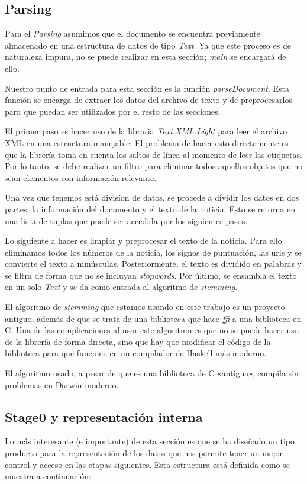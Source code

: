 \documentclass{nrfh-ish}
\begin{document}
\subsection{Parsing}
Para el \textit{Parsing} asumimos que el documento se encuentra
previamente almacenado en una estructura de datos de tipo \textit{Text}.
Ya que este proceso es de naturaleza impura, no se puede realizar
en esta sección; \textit{main} se encargará de ello.

Nuestro punto de entrada para esta sección es la función 
\textit{parseDocument}. Esta función se encarga de extraer los datos
del archivo de texto y de preprocesarlos para que puedan ser utilizados
por el resto de las secciones.

El primer paso es hacer uso de la libraria \textit{Text.XML.Light} para
leer el archivo XML en una estructura manejable. El problema de hacer
esto directamente es que la librería toma en cuenta los saltos de línea
al momento de leer las etiquetas. Por lo tanto, se debe realizar un
filtro para eliminar todos aquellos objetos que no sean elementos con
información relevante.

Una vez que tenemos está divisíon de datos, se procede a dividir los
datos en dos partes: la información del documento y el texto de la
noticia. Esto se retorna en una lista de tuplas que puede ser accedida
por los siguientes pasos.

Lo siguiente a hacer es limpiar y preprocesar el texto de la noticia.
Para ello eliminamos todos los números de la noticia, los signos de
puntuación, las urls y se convierte el texto a minúsculas. Posteriormente,
el texto es dividido en palabras y se filtra de forma que no se incluyan
\textit{stopwords}. Por último, se ensambla el texto en un solo
\textit{Text} y se da como entrada al algoritmo de \textit{stemming}.

El algoritmo de \textit{stemming} que estamos usando en este trabajo
es un proyecto antiguo, además de que se trata de una biblioteca que
hace \textit{ffi} a una biblioteca en C. Una de las complicaciones al
usar este algoritmo es que no se puede hacer uso de la librería de
forma directa, sino que hay que modificar el código de la biblioteca
para que funcione en un compilador de Haskell más moderno.

El algoritmo usado, a pesar de que es una biblioteca de C «antigua»,
compila sin problemas en Darwin moderno.

\subsection{Stage0 y representación interna}
Lo más interesante (e importante) de esta sección es que se ha
diseñado un tipo producto para la representación de los datos que
nos permite tener un mejor control y acceso en las etapas siguientes.
Esta estructura está definida como se muestra a continuación:
\end{document}
